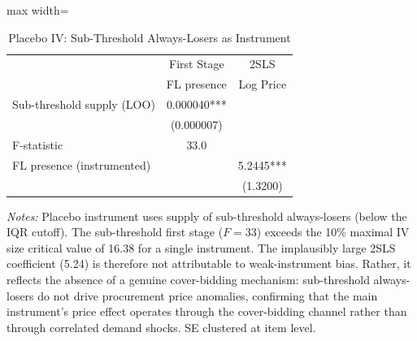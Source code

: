 \begin{table}[htbp]
\centering
\caption{Placebo IV: Sub-Threshold Always-Losers as Instrument}
\label{tab:iv_placebo}
\begin{adjustbox}{max width=\textwidth}
\begin{threeparttable}
\small
\begin{tabular}{lcc}
\toprule
 & First Stage & 2SLS \\
 & FL presence & Log Price \\
\midrule
Sub-threshold supply (LOO) & 0.000040*** & \\
 & (0.000007) & \\
F-statistic & 33.0 & \\
FL presence (instrumented) & & 5.2445*** \\
 & & (1.3200) \\
\bottomrule
\end{tabular}
\begin{tablenotes}
\small
\item \textit{Notes:} Placebo instrument uses supply of sub-threshold
always-losers (below the IQR cutoff). The sub-threshold first stage
($F = 33$) exceeds the \citet{stock2005testing} 10\% maximal IV size
critical value of 16.38 for a single instrument. The implausibly large
2SLS coefficient (5.24) is therefore not attributable to weak-instrument
bias. Rather, it reflects the absence of a genuine cover-bidding
mechanism: sub-threshold always-losers do not drive procurement price
anomalies, confirming that the main instrument's price effect operates
through the cover-bidding channel rather than through correlated demand
shocks. SE clustered at item level.
\end{tablenotes}
\end{threeparttable}
\end{adjustbox}
\end{table}
